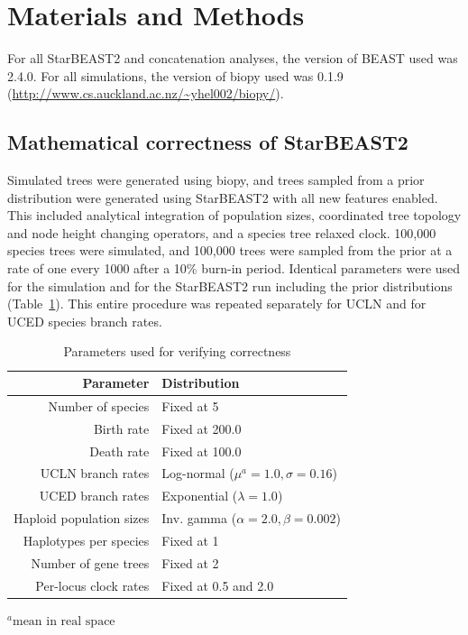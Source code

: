\documentclass[nogrid]{MBE}%
\begin{document}
\section{Materials and Methods}

For all StarBEAST2 and concatenation analyses, the version of BEAST used was
2.4.0. For all simulations, the version of biopy used was 0.1.9 (\url{http://www.cs.auckland.ac.nz/~yhel002/biopy/}).

\subsection{Mathematical correctness of StarBEAST2}

Simulated trees were generated using biopy, and trees sampled from a prior
distribution were generated using StarBEAST2 with all new features enabled. This
included analytical integration of population sizes, coordinated tree topology
and node height changing operators, and a species tree relaxed clock. 100,000
species trees were simulated, and 100,000 trees were sampled from the prior at a
rate of one every 1000 after a 10\% burn-in period. Identical parameters were
used for the simulation and for the StarBEAST2 run including the prior
distributions (Table~\ref{tab:correctParameters}). This entire procedure was
repeated separately for UCLN and for UCED species branch rates.

\begin{table}[htb!]
\centering
\caption{Parameters used for verifying correctness}
\label{tab:correctParameters}
\begin{threeparttable}
\begin{adjustbox}{center}
\small
\begin{tabular}{rl}
\hline
Parameter & Distribution\tabularnewline
\hline
Number of species & Fixed at 5\tabularnewline
Birth rate & Fixed at 200.0\tabularnewline
Death rate & Fixed at 100.0\tabularnewline
UCLN branch rates & Log-normal ($\mu^a = 1.0, \sigma = 0.16$)\tabularnewline
UCED branch rates & Exponential ($\lambda = 1.0$)\tabularnewline
Haploid population sizes & Inv. gamma ($\alpha = 2.0, \beta = 0.002$)\tabularnewline
Haplotypes per species & Fixed at 1\tabularnewline
Number of gene trees & Fixed at 2\tabularnewline
Per-locus clock rates & Fixed at 0.5 and 2.0\tabularnewline
\hline
\end{tabular}
\end{adjustbox}
\begin{tablenotes}
\item ${}^a\text{mean in real space}$
\end{tablenotes}
\end{threeparttable}
\end{table}
\end{document}
